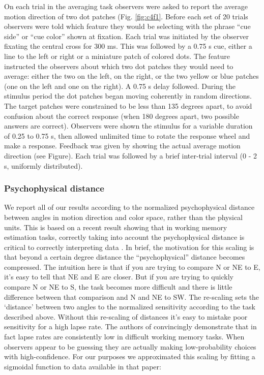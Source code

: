 On each trial in the averaging task observers were asked to report the average motion direction of two dot patches (Fig. \ref{fig:c4f1}. Before each set of 20 trials observers were told which feature they would be selecting with the phrase ``cue side'' or ``cue color'' shown at fixation. Each trial was initiated by the observer fixating the central cross for 300 ms. This was followed by a 0.75 s cue, either a line to the left or right or a miniature patch of colored dots. The feature instructed the observers about which two dot patches they would need to average: either the two on the left, on the right, or the two yellow or blue patches (one on the left and one on the right). A 0.75 s delay followed. During the stimulus period the dot patches began moving coherently in random directions. The target patches were constrained to be less than 135 degrees apart, to avoid confusion about the correct response (when 180 degrees apart, two possible answers are correct). Observers were shown the stimulus for a variable duration of 0.25 to 0.75 s, then allowed unlimited time to rotate the response wheel and make a response. Feedback was given by showing the actual average motion direction (see Figure). Each trial was followed by a brief inter-trial interval (0 - 2 s, uniformly distributed).

\subsubsection{Psychophysical distance}

We report all of our results according to the normalized psychophysical distance between angles in motion direction and color space, rather than the physical units. This is based on a recent result showing that in working memory estimation tasks, correctly taking into account the psychophysical distance is critical to correctly interpreting data \citep{Schurgin2018-vi}. In brief, the motivation for this scaling is that beyond a certain degree distance the ``psychophysical'' distance becomes compressed. The intuition here is that if you are trying to compare N or NE to E, it's easy to tell that NE and E are closer. But if you are trying to quickly compare N or NE to S, the task becomes more difficult and there is little difference between that comparison and N and NE to SW. The re-scaling sets the `distance' between two angles to the normalized sensitivity according to the task described above. Without this re-scaling of distances it's easy to mistake poor sensitivity for a high lapse rate. The authors of \citet{Schurgin2018-vi} convincingly demonstrate that in fact lapse rates are consistently low in difficult working memory tasks. When observers appear to be guessing they are actually making low-probability choices with high-confidence. For our purposes we approximated this scaling by fitting a sigmoidal function to data available in that paper: 


